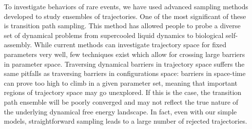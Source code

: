 \documentclass[11pt]{article}
\begin{document}

To investigate behaviors of rare events, we have used advanced sampling methods developed to study ensembles of trajectories. One of the most significant of these is transition path sampling. %
This method has allowed people to probe a diverse set of dynamical problems from supercooled liquid dynamics %
to biological self-assembly. %
While current methods can investigate trajectory space for fixed parameters very well, few techniques exist which allow for crossing large barriers in parameter space. Traversing dynamical barriers in trajectory space suffers the same pitfalls as traversing barriers in configurations space: barriers in space-time can prove too high to climb in a given parameter set, meaning that important regions of trajectory space may go unexplored.  If this is the case, the transition path ensemble will be poorly converged and may not reflect the true nature of the underlying dynamical free energy landscape. In fact, even with our simple models, straightforward sampling leads to a large number of rejected trajectories.

\end{document}
